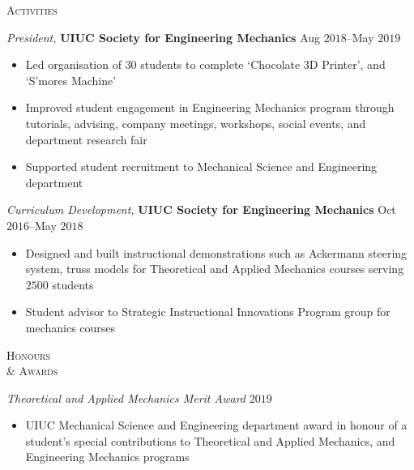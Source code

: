 \documentclass[10pt]{article}
\begin{document}
\begin{multicols}{2}
\textsc{\small Activities}
\columnbreak

{\sl President,} \textbf{UIUC Society for Engineering Mechanics} \hfill Aug $2018$--May $2019$

\vspace{-1.75em}
\begin{itemize}[label=-]
    \setlength\itemsep{-0.25em}
    \item Led organisation of $30$ students to complete `Chocolate 3D Printer', and `S'mores Machine'
    \item Improved student engagement in Engineering Mechanics program through tutorials, advising, company meetings, workshops, social events, and department research fair
    \item Supported student recruitment to Mechanical Science and Engineering department
\end{itemize}
\vspace{-2.0em}

\vspace{0.5em}
%
{\sl Curriculum Development,} \textbf{UIUC Society for Engineering Mechanics} \hfill Oct $2016$--May $2018$

\vspace{-1.75em}
\begin{itemize}[label=-]
    \setlength\itemsep{-0.25em}
    \item Designed and built instructional demonstrations such as  Ackermann steering system, truss models for Theoretical and Applied Mechanics courses serving $2500$ students
    \item Student advisor to Strategic Instructional Innovations Program group for mechanics courses
\end{itemize}
\vspace{-2.0em}

\end{multicols}
\vspace{-1.5em} 
\begin{multicols}{2}
\textsc{\small Honours \\ \& Awards}
\columnbreak

{\sl Theoretical and Applied Mechanics Merit Award} \hfill $2019$

\vspace{-1.75em}
\begin{itemize}[label= ]
    \setlength\itemsep{-0.25em}
    \item  UIUC Mechanical Science and Engineering department award in honour of a student's special contributions to Theoretical and Applied Mechanics, and Engineering Mechanics programs
\end{itemize}
\vspace{-2.0em}

\end{multicols}
\end{document}
